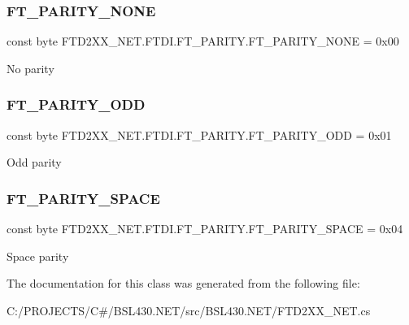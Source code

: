 \subsubsection{\texorpdfstring{FT\_PARITY\_NONE}{FT\_PARITY\_NONE}}
{\footnotesize\ttfamily const byte F\+T\+D2\+X\+X\+\_\+\+N\+E\+T.\+F\+T\+D\+I.\+F\+T\+\_\+\+P\+A\+R\+I\+T\+Y.\+F\+T\+\_\+\+P\+A\+R\+I\+T\+Y\+\_\+\+N\+O\+NE = 0x00}



No parity 

\mbox{\label{class_f_t_d2_x_x___n_e_t_1_1_f_t_d_i_1_1_f_t___p_a_r_i_t_y_a7b0aa388683cbb431524ebe771d8f969}} 
\subsubsection{\texorpdfstring{FT\_PARITY\_ODD}{FT\_PARITY\_ODD}}
{\footnotesize\ttfamily const byte F\+T\+D2\+X\+X\+\_\+\+N\+E\+T.\+F\+T\+D\+I.\+F\+T\+\_\+\+P\+A\+R\+I\+T\+Y.\+F\+T\+\_\+\+P\+A\+R\+I\+T\+Y\+\_\+\+O\+DD = 0x01}



Odd parity 

\mbox{\label{class_f_t_d2_x_x___n_e_t_1_1_f_t_d_i_1_1_f_t___p_a_r_i_t_y_a954f5c6e8464515af87192e688c330bb}} 
\subsubsection{\texorpdfstring{FT\_PARITY\_SPACE}{FT\_PARITY\_SPACE}}
{\footnotesize\ttfamily const byte F\+T\+D2\+X\+X\+\_\+\+N\+E\+T.\+F\+T\+D\+I.\+F\+T\+\_\+\+P\+A\+R\+I\+T\+Y.\+F\+T\+\_\+\+P\+A\+R\+I\+T\+Y\+\_\+\+S\+P\+A\+CE = 0x04}



Space parity 



The documentation for this class was generated from the following file\+:\begin{DoxyCompactItemize}
\item 
C\+:/\+P\+R\+O\+J\+E\+C\+T\+S/\+C\#/\+B\+S\+L430.\+N\+E\+T/src/\+B\+S\+L430.\+N\+E\+T/F\+T\+D2\+X\+X\+\_\+\+N\+E\+T.\+cs\end{DoxyCompactItemize}
